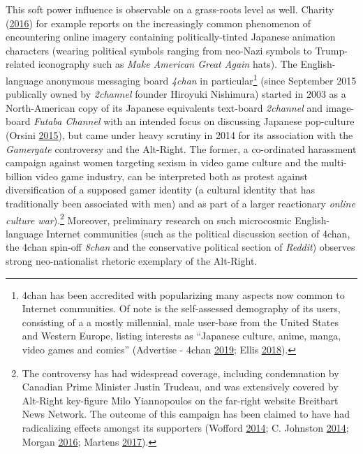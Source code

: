 \documentclass[10pt,british,A4paper,,openany]{memoir}
\begin{document}
This soft power influence is observable on a grass-roots level as well.
Charity (\protect\hyperlink{ref-charity_why_2016}{2016}) for example
reports on the increasingly common phenomenon of encountering online
imagery containing politically-tinted Japanese animation characters
(wearing political symbols ranging from neo-Nazi symbols to
Trump-related iconography such as \emph{Make American Great Again}
hats). The English-language anonymous messaging board \emph{4chan} in
particular\footnote{4chan has been accredited with popularizing many
  aspects now common to Internet communities. Of note is the
  self-assessed demography of its users, consisting of a a mostly
  millennial, male user-base from the United States and Western Europe,
  listing interests as ``Japanese culture, anime, manga, video games and
  comics'' (Advertise - 4chan
  \protect\hyperlink{ref-noauthor_advertise_nodate}{2019}; Ellis
  \protect\hyperlink{ref-ellis_4chan_2018}{2018}).} (since September
2015 publically owned by \emph{2channel} founder Hiroyuki Nishimura)
started in 2003 as a North-American copy of its Japanese equivalents
text-board \emph{2channel} and image-board \emph{Futaba Channel} with an
intended focus on discussing Japanese pop-culture (Orsini
\protect\hyperlink{ref-orsini_how_2015}{2015}), but came under heavy
scrutiny in 2014 for its association with the \emph{Gamergate}
controversy and the Alt-Right. The former, a co-ordinated harassment
campaign against women targeting sexism in video game culture and the
multi-billion video game industry, can be interpreted both as protest
against diversification of a supposed gamer identity (a cultural
identity that has traditionally been associated with men) and as part of
a larger reactionary \emph{online culture war}).\footnote{The
  controversy has had widespread coverage, including condemnation by
  Canadian Prime Minister Justin Trudeau, and was extensively covered by
  Alt-Right key-figure Milo Yiannopoulos on the far-right website
  Breitbart News Network. The outcome of this campaign has been claimed
  to have had radicalizing effects amongst its supporters (Wofford
  \protect\hyperlink{ref-wofford_is_2014}{2014}; C. Johnston
  \protect\hyperlink{ref-johnston_chat_2014}{2014}; Morgan
  \protect\hyperlink{ref-morgan_analysis_2016}{2016}; Martens
  \protect\hyperlink{ref-martens_rally_2017}{2017}).} Moreover,
preliminary research on such microcosmic English-language Internet
communities (such as the political discussion section of 4chan, the
4chan spin-off \emph{8chan} and the conservative political section of
\emph{Reddit}) observes strong neo-nationalist rhetoric exemplary of the
Alt-Right.
\end{document}
